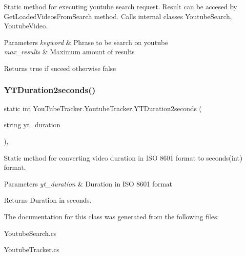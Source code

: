 Static method for executing youtube search request. Result can be accesed by {\ttfamily Get\+Loaded\+Videos\+From\+Search} method. Calls internal classes {\ttfamily Youtube\+Search}, {\ttfamily Youtube\+Video}. 


\begin{DoxyParams}{Parameters}
{\em keyword} & Phrase to be search on youtube\\
\hline
{\em max\+\_\+results} & Maximum amount of results\\
\hline
\end{DoxyParams}
\begin{DoxyReturn}{Returns}
{\ttfamily true} if suceed otherwise {\ttfamily false}
\end{DoxyReturn}
\mbox{\label{class_you_tube_tracker_1_1_youtube_tracker_a431b19f99b43d033603fb67b66dde65a}} 
\subsubsection{\texorpdfstring{Y\+T\+Duration2seconds()}{YTDuration2seconds()}}
{\footnotesize\ttfamily static int You\+Tube\+Tracker.\+Youtube\+Tracker.\+Y\+T\+Duration2seconds (\begin{DoxyParamCaption}\item[{string}]{yt\+\_\+duration }\end{DoxyParamCaption})\hspace{0.3cm}{\ttfamily [inline]}, {\ttfamily [static]}}



Static method for converting video duration in I\+SO 8601 format to seconds(int) format. 


\begin{DoxyParams}{Parameters}
{\em yt\+\_\+duration} & Duration in I\+SO 8601 format\\
\hline
\end{DoxyParams}
\begin{DoxyReturn}{Returns}
Duration in seconds.
\end{DoxyReturn}


The documentation for this class was generated from the following files\+:\begin{DoxyCompactItemize}
\item 
Youtube\+Search.\+cs\item 
Youtube\+Tracker.\+cs\end{DoxyCompactItemize}

